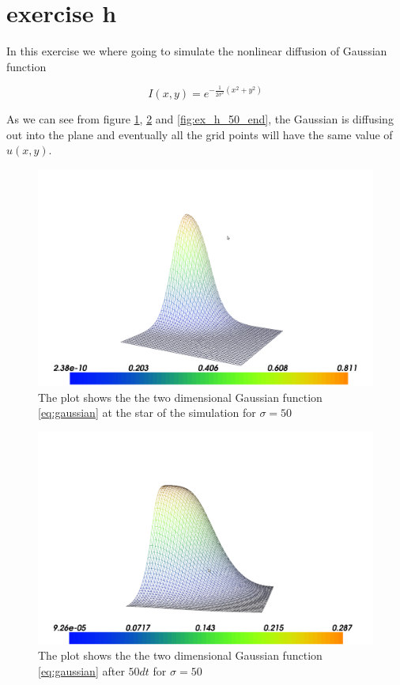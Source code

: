 \section{exercise h}

In this exercise we where going to simulate the nonlinear diffusion of Gaussian function

\begin{equation}
 I(x,y) = e^{-\frac{1}{2\sigma^2} \left( x^2 + y^2 \right)}
 \label{eq:gaussian}
\end{equation}

As we can see from figure \ref{fig:ex_h_start}, \ref{fig:ex_h_50_dt} and \ref{fig:ex_h_50_end}, the Gaussian is diffusing out into the plane and eventually all the grid points will
have the same value of $u(x,y)$.

\begin{figure}[h]
\begin{center}
\includegraphics[scale=0.2]{images/ex_h_start.png}
\end{center}
\caption{The plot shows the the two dimensional Gaussian function \eqref{eq:gaussian} at the star of the simulation for $\sigma = 50$}
\label{fig:ex_h_start}
\end{figure}

\begin{figure}[h]
\begin{center}
\includegraphics[scale=0.2]{images/ex_h_50_dt.png}
\end{center}
\caption{The plot shows the the two dimensional Gaussian function \eqref{eq:gaussian} after $50 dt$ for $\sigma = 50$}
\label{fig:ex_h_50_dt}
\end{figure}

